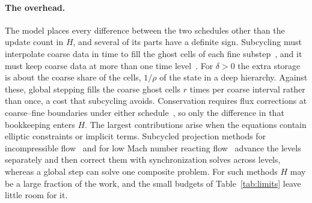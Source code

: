 \documentclass[12pt]{article}
\theoremstyle{remark}
\begin{document}
\paragraph{The overhead.}
The model places every difference between the two schedules other than the update count in $H$, and several of its parts have a definite sign. Subcycling must interpolate coarse data in time to fill the ghost cells of each fine substep~\cite{mccorquodale2011high}, and it must keep coarse data at more than one time level~\cite{dursi2005efficiency}. For $\delta>0$ the extra storage is about the coarse share of the cells, $1/\rho$ of the state in a deep hierarchy. Against these, global stepping fills the coarse ghost cells $r$ times per coarse interval rather than once, a cost that subcycling avoids. Conservation requires flux corrections at coarse--fine boundaries under either schedule~\cite{berger1989local}, so only the difference in that bookkeeping enters $H$. The largest contributions arise when the equations contain elliptic constraints or implicit terms. Subcycled projection methods for incompressible flow~\cite{almgren1998conservative,martin2008cell} and for low Mach number reacting flow~\cite{day2000numerical} advance the levels separately and then correct them with synchronization solves across levels, whereas a global step can solve one composite problem. For such methods $H$ may be a large fraction of the work, and the small budgets of Table~\ref{tab:limits} leave little room for it.
\end{document}
